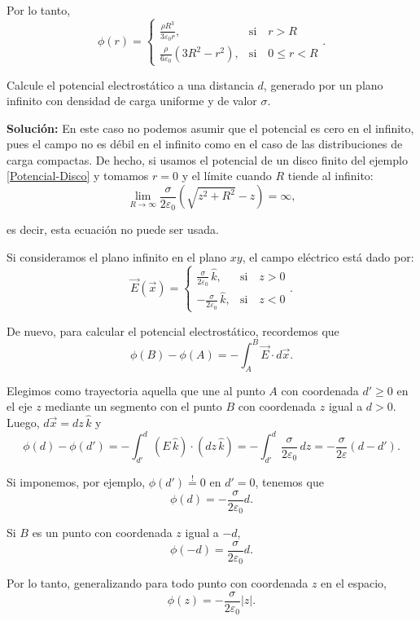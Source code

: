 \begin{ejemplo}
\begin{itemize}
Por lo tanto,
\begin{equation*}
\phi(r) =  \left\{ \begin{array}{cl}
   \frac{\rho R^3 }{3\varepsilon_0 r} ,  & \text{si} \quad r > R  \\
    \frac{\rho}{6\varepsilon_0} (3R^2-r^2), & \text{si} \quad  0 \leq r < R 
\end{array} \right. .
\end{equation*}

\end{itemize}
\end{ejemplo}

\begin{ejemplo}\label{Potencial-Plano-Inf}
     Calcule el potencial electrostático a una distancia $d$, generado por un plano infinito con densidad de carga uniforme y de valor $\sigma$.

\textbf{Solución:} En este caso no podemos asumir que el potencial es cero en el infinito, pues el campo no es débil en el infinito como en el caso de las distribuciones de carga compactas. De hecho, si usamos el potencial de un disco  finito del ejemplo \ref{Potencial-Disco} y tomamos $r = 0$ y el límite cuando $R$ tiende al infinito:
$$\lim_{R \to \infty} \frac{\sigma}{2\varepsilon_0} \left( \sqrt{z^2 + R^2} - z \right) = \infty,$$

es decir, esta ecuación no puede ser usada.

Si consideramos el plano infinito en el plano $xy$, el campo eléctrico está dado por:
\begin{equation*}
\Vec{E}(\Vec{x}) =  \left\{ \begin{array}{cl}
   \frac{\sigma}{2 \varepsilon_0} \,\hat{k} ,  & \text{si} \quad z > 0  \\
    - \frac{\sigma}{2 \varepsilon_0} \,\hat{k}, & \text{si} \quad  z < 0 
\end{array} \right. .
\end{equation*}

De nuevo, para calcular el potencial electrostático, recordemos que
$$\phi(B) - \phi(A) = - \int_A^B \Vec{E} \cdot d\Vec{x}.$$

Elegimos como trayectoria aquella que une al punto $A$ con coordenada $d' \geq 0$ en el eje $z$ mediante un segmento con el punto $B$ con coordenada $z$ igual a $d > 0$. Luego, $d\Vec{x} = dz\,\hat{k}$ y
$$\phi(d) - \phi(d') = - \int_{d'}^{d} (E\,\hat{k}) \cdot (dz\,\hat{k}) = - \int_{d'}^d \frac{\sigma}{2\varepsilon_0} \,dz = - \frac{\sigma}{2\varepsilon}(d-d').$$

Si imponemos, por ejemplo, $\phi(d') \stackrel{!}{=} 0$ en $d' = 0$, tenemos que
$$\phi(d) = - \frac{\sigma}{2\varepsilon_0} d.$$

Si $B$ es un punto con coordenada $z$ igual a $-d$, 
$$\phi(-d)= \frac{\sigma}{2\varepsilon_0} d.$$

Por lo tanto, generalizando para todo punto con coordenada $z$ en el espacio,
$$\phi(z) = - \frac{\sigma}{2\varepsilon_0}|z|.$$

\end{ejemplo}

